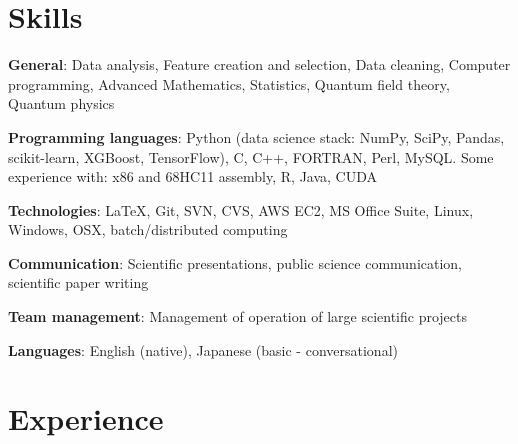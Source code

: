 \documentclass[margin,line]{resume}
\begin{document}
\begin{resume}
    \section{\mysidestyle Skills}
    \begin{list2}
        \item \textbf{General}: Data analysis, Feature creation and selection, Data cleaning, Computer programming, Advanced Mathematics, Statistics, Quantum field theory, Quantum physics
        \item \textbf{Programming languages}: Python (data science stack: NumPy, SciPy, Pandas, scikit-learn, XGBoost, TensorFlow), C, C++, FORTRAN, Perl, MySQL. Some experience with: x86 and 68HC11 assembly, R, Java, CUDA
        \item \textbf{Technologies}: \LaTeX, Git, SVN, CVS, AWS EC2, MS Office Suite, Linux, Windows, OSX, batch/distributed computing
        \item \textbf{Communication}: Scientific presentations, public science communication, scientific paper writing
        \item \textbf{Team management}: Management of operation of large scientific projects
        \item \textbf{Languages}: English (native), Japanese (basic - conversational)
    \end{list2}




    \section{\mysidestyle Experience}

    \begin{list2}


\end{list2}
\end{resume}
\end{document}
